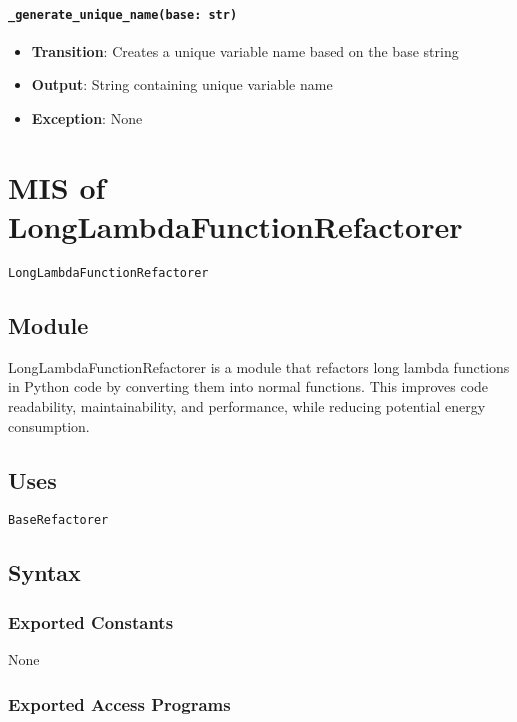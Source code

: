 \documentclass[12pt, titlepage]{article}
\begin{document}
\paragraph{\texttt{\_generate\_unique\_name(base: str)}}
\begin{itemize}
  \item \textbf{Transition}: Creates a unique variable name based on the base string
  \item \textbf{Output}: String containing unique variable name
  \item \textbf{Exception}: None
\end{itemize}


\section{MIS of LongLambdaFunctionRefactorer} \label{mis:LLF}

\texttt{LongLambdaFunctionRefactorer}

\subsection{Module}
LongLambdaFunctionRefactorer is a module that refactors 
long lambda functions in Python code by converting them into normal functions. 
This improves code readability, maintainability, and performance, while reducing potential energy consumption.

\subsection{Uses}

\texttt{BaseRefactorer}

\subsection{Syntax}

\subsubsection{Exported Constants}
None

\subsubsection{Exported Access Programs}
\end{document}

